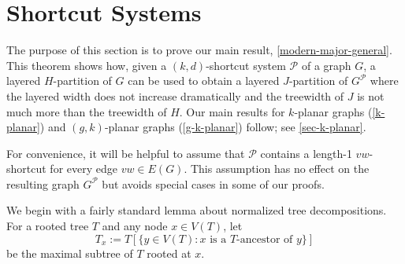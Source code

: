 \documentclass{patmorin}
\begin{document}
%
%



\section{Shortcut Systems}
\label{Structure}

The purpose of this section is to prove our main result, \cref{modern-major-general}. This theorem shows how, given a $(k,d)$-shortcut system $\mathcal{P}$ of a graph $G$, a layered $H$-partition of $G$ can be used to obtain a layered $J$-partition of $G^{\mathcal{P}}$ where the layered width  does not increase dramatically and the treewidth of $J$ is not much more than the treewidth of $H$.  Our main results for $k$-planar graphs (\cref{k-planar}) and $(g,k)$-planar graphs (\cref{g-k-planar}) follow; see \cref{sec-k-planar}.

For convenience, it will be helpful to assume that $\mathcal{P}$ contains a length-1 $vw$-shortcut for every edge $vw\in E(G)$.  This assumption has no effect on the resulting graph $G^{\mathcal{P}}$ but avoids special cases in some of our proofs.

We begin with a fairly standard lemma about normalized tree decompositions. 
For a rooted tree $T$ and any node $x\in V(T)$, let  
$$T_x := T[\{y\in V(T):\mbox{$x$ is a $T$-ancestor of $y$}\}]$$ 
be the maximal subtree of $T$ rooted at $x$.  
\end{document}
